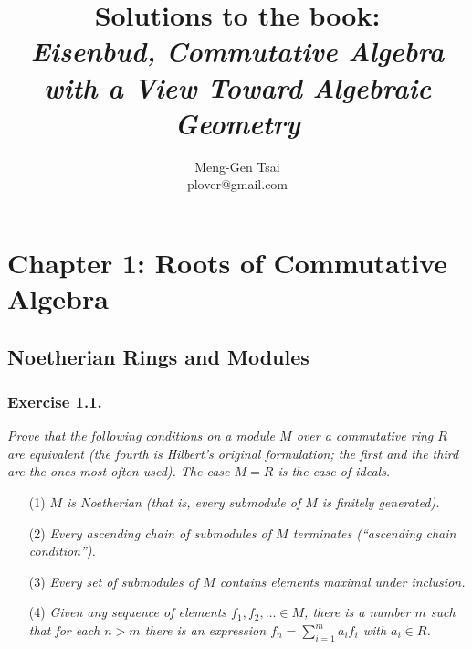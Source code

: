 \documentclass{article}
\title{\textbf{Solutions to the book: \\
\emph{Eisenbud, Commutative Algebra with a View Toward Algebraic Geometry}}}
\author{Meng-Gen Tsai \\ plover@gmail.com}
\begin{document}
\maketitle
\tableofcontents












\newpage
\section*{Chapter 1: Roots of Commutative Algebra \\}



\subsection*{Noetherian Rings and Modules \\}



\subsubsection*{Exercise 1.1.}
\emph{Prove that the following conditions on a module $M$ over a commutative ring $R$
are equivalent (the fourth is Hilbert's original formulation;
the first and the third are the ones most often used).
The case $M = R$ is the case of ideals.}
\begin{enumerate}
\item[(1)]
\emph{$M$ is Noetherian (that is, every submodule of $M$ is finitely generated).}
\item[(2)]
\emph{Every ascending chain of submodules of $M$ terminates
(``ascending chain condition'').}
\item[(3)]
\emph{Every set of submodules of $M$ contains elements maximal under inclusion.}
\item[(4)]
\emph{Given any sequence of elements $f_1, f_2, \ldots \in M$,
there is a number $m$ such that for each $n > m$ there is an expression
$f_n = \sum_{i=1}^{m} a_i f_i$ with $a_i \in R$.} \\
\end{enumerate}
\end{document}
